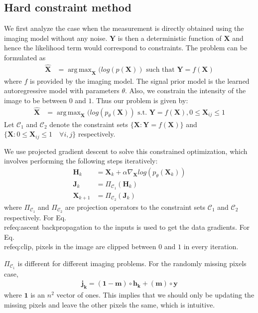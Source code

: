 \documentclass[journal,twoside]{IEEEtran}
\DeclareMathOperator*{\argmax}{arg\,max}
\newcommand{\X}{\mathbf{X}}
\newcommand{\Y}{\mathbf{Y}}
\begin{document}
\subsection{Hard constraint method}
\label{sec:hard_con}
We first analyze the case when the measurement is directly obtained using the imaging model without any noise. $\Y$ is then a deterministic function of $\X$ and hence the likelihood term would correspond to constraints. The problem can be formulated as 
\begin{align}
\mathbf{\hat{X}} &= \argmax_{\X} ( log(p(\X)) \text{ such that } \Y = f(\X)
\end{align}
where $f$ is provided by the imaging model. The signal prior model is the learned autoregressive model with parameters $\theta$. Also, we constrain the intensity of the image to be between $0$ and $1$. Thus our problem is given by:
\begin{align}
\mathbf{\hat{X}} &= \argmax_{\X} ( log(p_{\theta}(\X)) \text{ s.t. } \Y = f(\X), 0 \leq \X_{ij} \leq 1
\end{align}
Let $\mathcal{C}_1$ and $\mathcal{C}_2$ denote the constraint sets $\{\X:\Y = f(\X)\}$ and $\{\X: 0 \leq \X_{ij} \leq 1 \quad \forall i,j \}$ respectively.


We use projected gradient descent to solve this constrained optimization, which involves performing the following steps iteratively:
\begin{align}
\label{eq:ascent}
\mathbf{H}_k &= \X_{k} + \alpha \nabla_{\X} log(p_{\theta}(\X_k))\\
\label{eq:project}
\mathbf{J}_k &= \Pi_{\mathcal{C}_1}(\mathbf{H}_k)\\
\label{eq:clip}
\mathbf{X}_{k+1} &= \Pi_{\mathcal{C}_2}(\mathbf{J}_{k})
\end{align}
where $\Pi_{\mathcal{C}_1}$ and $\Pi_{\mathcal{C}_2}$ are projection operators to the constraint sets $\mathcal{C}_1$ and $\mathcal{C}_2$ respectively. For Eq.\\ref{eq:ascent} backpropagation to the inputs is used to get the data gradients. For Eq.\\ref{eq:clip}, pixels in the image are clipped between $0$ and $1$ in every iteration. 

$\Pi_{\mathcal{C}_1}$ is different for different imaging problems. For the randomly missing pixels case, 
\begin{align}
\label{eq:proj_inpaint}
\mathbf{j_k} = (\mathbf{1} - \mathbf{m}) \circ \mathbf{h_k} + (\mathbf{m}) \circ \mathbf{y}
\end{align}
where $\mathbf{1}$ is an $n^2$ vector of ones. This implies that we should only be updating the missing pixels and leave the other pixels the same, which is intuitive. 
\end{document}
